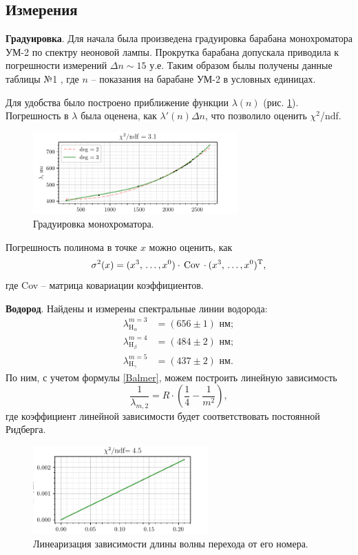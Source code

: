 \subsection*{Измерения}


\textbf{Градуировка}. Для начала была произведена градуировка барабана монохроматора УМ-2 по спектру неоновой лампы. Прокрутка барабана допускала приводила к погрешности измерений $\Delta n \sim 15$ у.е. Таким образом былы получены данные таблицы №1 
, где $n$ -- показания на барабане УМ-2 в условных единицах.


Для удобства было построено приближение функции $\lambda(n)$ (рис. \ref{fig:1}). Погрешность в $\lambda$ была оценена, как $\lambda'(n) \Delta n$, что позволило оценить $\chi^2$/ndf. 

\begin{figure}[h]
    \centering
    \includegraphics[width=0.7\textwidth]{fig1.pdf}
    \caption{Градуировка монохроматора.}
    \label{fig:1}
\end{figure}

Погрешность полинома в точке $x$ можно оценить, как
\begin{equation*}
    \sigma^2 (x) = (x^3,\, \ldots, x^0) \cdot \,\text{Cov}\,  \cdot (x^3,\, \ldots, x^0)^{\text{T}},
\end{equation*}
где Cov -- матрица ковариации коэффициентов.


\textbf{Водород}. Найдены и измерены спектральные линии водорода:
\begin{align*}
    \lambda_{\text{H}_{\alpha}}^{m=3}  &= (656 \pm 1) \text{ нм}; \\ 
    \lambda_{\text{H}_{\beta}}^{m=4}   &= (484 \pm 2) \text{ нм}; \\ 
    \lambda_{\text{H}_{\gamma}}^{m=5}  &= (437 \pm 2) \text{ нм}.
\end{align*}
По ним, с учетом формулы \eqref{Balmer}, можем построить линейную зависимость 
$$\frac{1}{\lambda_{m,2}} = R \cdot \left(\frac{1}{4} - \frac{1}{m^2}\right),$$ где коэффициент линейной зависимости будет соответствовать постоянной Ридберга. 

\begin{figure}[h]
    \centering
    \includegraphics[width=0.6\textwidth]{fig2.pdf}
    \caption{Линеаризация зависимости длины волны перехода от его номера.}
\end{figure}

